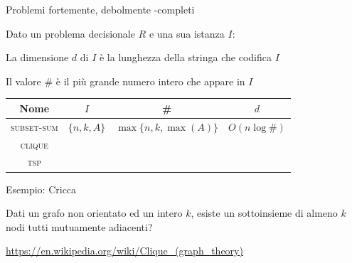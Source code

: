 \begin{frame}{Problemi fortemente, debolmente \NP-completi}

\vspace{-9pt}
\begin{myboxtitle}
Dato un problema decisionale $R$ e una sua istanza $I$:
\BIL
\item La \alert{dimensione $d$} di $I$ è la lunghezza della stringa che codifica $I$
\item Il \alert{valore \#} è il più grande numero intero che appare in $I$
\EIL
\end{myboxtitle}

\begin{myboxtitle}[Esempi]
\small
\begin{tabular}{|c|c|c|c|}
\hline
\textbf{Nome} & $I$ & \# & $d$ \\\hline
\textsc{subset-sum} & $ \{n, k, A\}$ & $\max\{n, k, \max(A)\}$ & $O(n \log \#)$ \\\hline
\textsc{clique} & \phantom{$\{n, m, k, G \}$} & \phantom{$\max\{n, m, k\}$} & \phantom{$O(n + m + \log\#)$}\\\hline
\textsc{tsp} & \phantom{$\{n, k, d \}$} & \phantom{$\max\{n, k, \max(d)\}$} &
\phantom{$O(n^2 \log \#)$} \\\hline
\end{tabular}
\end{myboxtitle}

\end{frame}

\begin{frame}{Esempio: Cricca}

\vspace{-9pt}
\begin{myboxtitle}
Dati un grafo non orientato ed un intero $k$, esiste un sottoinsieme di almeno
$k$ nodi tutti mutuamente adiacenti?
\end{myboxtitle}


\vfill
\tiny
\url{https://en.wikipedia.org/wiki/Clique_(graph_theory)}

\end{frame}

